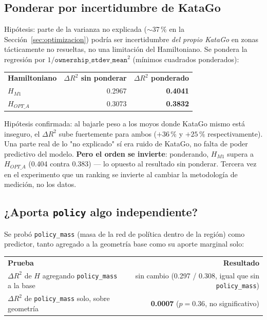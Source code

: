 \documentclass[11pt, a4paper]{article}
\newcommand{\TH}[1]{\cellcolor{cTHbg}\color{white}\textbf{#1}}
\newcommand{\good}[1]{\color{cGood}\textbf{#1}}
\newcommand{\bad}[1]{\color{cBad}\textbf{#1}}
\begin{document}
\subsection{Ponderar por incertidumbre de KataGo}

Hip\'otesis: parte de la varianza no explicada ($\sim$37\,\% en la
Secci\'on~\ref{sec:optimizacion}) podr\'ia ser incertidumbre \emph{del
propio KataGo} en zonas t\'acticamente no resueltas, no una limitaci\'on
del Hamiltoniano. Se pondera la regresi\'on por
$1/\texttt{ownership\_stdev\_mean}^2$ (m\'inimos cuadrados ponderados):

\medskip
\begin{center}
\begin{tabular}{lrr}
  \TH{Hamiltoniano} & \TH{$\Delta R^2$ sin ponderar} & \TH{$\Delta R^2$ ponderado} \\[1pt]
  $H_{M1}$      & 0.2967 & \good{0.4041} \\
  $H_{OPT\_A}$  & 0.3073 & \good{0.3832} \\
\end{tabular}
\end{center}
\medskip

\begin{tcolorbox}[quotebox]
  Hip\'otesis confirmada: al bajarle peso a los moyos donde KataGo mismo
  est\'a inseguro, el $\Delta R^2$ sube fuertemente para ambos ($+36\,\%$
  y $+25\,\%$ respectivamente). Una parte real de lo "no explicado"
  s\'i era ruido de KataGo, no falta de poder predictivo del modelo.
  \textbf{Pero el orden se invierte}: ponderando, $H_{M1}$ supera a
  $H_{OPT\_A}$ (0.404 contra 0.383) --- lo opuesto al resultado sin
  ponderar. Tercera vez en el experimento que un ranking se invierte
  al cambiar la metodolog\'ia de medici\'on, no los datos.
\end{tcolorbox}

\subsection{¿Aporta \texttt{policy} algo independiente?}

Se prob\'o \texttt{policy\_mass} (masa de la red de pol\'itica dentro
de la regi\'on) como predictor, tanto agregado a la geometr\'ia base
como su aporte marginal solo:

\medskip
\begin{center}
\begin{tabular}{lr}
  \TH{Prueba} & \TH{Resultado} \\[1pt]
  $\Delta R^2$ de $H$ agregando \texttt{policy\_mass} a la base & sin cambio (0.297 / 0.308, igual que sin \texttt{policy\_mass}) \\
  $\Delta R^2$ de \texttt{policy\_mass} solo, sobre geometr\'ia & \bad{0.0007} ($p=0.36$, no significativo) \\
\end{tabular}
\end{center}
\medskip
\end{document}
